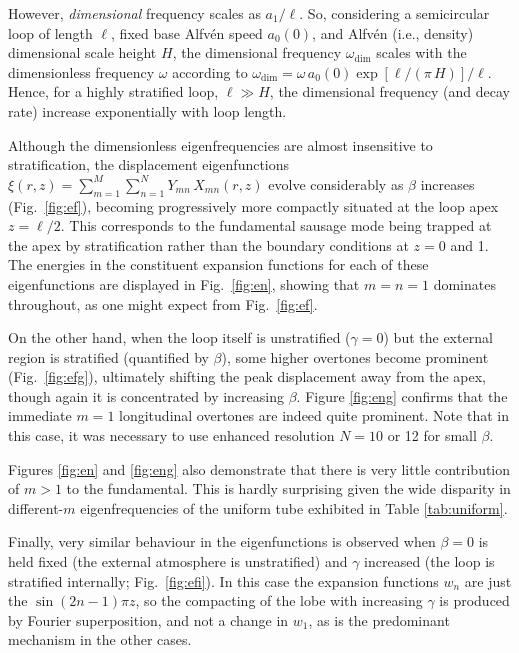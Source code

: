 \documentclass[12pt]{iopart}
\begin{document}
{However, \emph{dimensional} frequency scales as $a_1/\ell$. So, considering a semicircular loop of length $\ell$, fixed base Alfv\'en speed $a_0(0)$, and Alfv\'en (i.e., density) dimensional scale height $H$, the dimensional frequency $\omega_\text{dim}$ scales with the dimensionless frequency $\omega$ according to $\omega_\text{dim}=\omega\,a_0(0)\exp[\ell/(\pi\,H)]/\ell$. Hence, for a highly stratified loop, $\ell\gg H$, the dimensional frequency (and decay rate) increase exponentially with loop length.


Although the dimensionless eigenfrequencies are almost insensitive to stratification, the displacement eigenfunctions $\xi(r,z) = \sum_{m=1}^M \sum_{n=1}^N Y_{mn}\, X_{mn}(r,z)$ evolve considerably as $\beta$ increases (Fig.~\ref{fig:ef}), becoming progressively more compactly situated at the loop apex $z=\ell/2$. This corresponds to the fundamental sausage mode being trapped at the apex by stratification rather than the boundary conditions at $z=0$ and 1. The energies in the constituent expansion functions for each of these eigenfunctions are displayed in Fig.~\ref{fig:en}, showing that $m=n=1$ dominates throughout, as one might expect from Fig.~\ref{fig:ef}.



On the other hand, when the loop itself is unstratified ($\gamma=0$) but the external region is stratified (quantified by $\beta$), some higher overtones become prominent (Fig.~\ref{fig:efg}), ultimately shifting the peak displacement away from the apex, though again it is concentrated by increasing $\beta$. Figure \ref{fig:eng} confirms that the immediate $m=1$ longitudinal overtones are indeed quite prominent. Note that in this case, it was necessary to use enhanced resolution $N=10$ or 12 for small $\beta$.

Figures \ref{fig:en} and \ref{fig:eng} also demonstrate that there is very little contribution of $m>1$ to the fundamental. This is hardly surprising given the wide disparity in different-$m$ eigenfrequencies of the uniform tube exhibited in Table \ref{tab:uniform}.

Finally, very similar behaviour in the eigenfunctions is observed when $\beta=0$ is held fixed (the external atmosphere is unstratified) and $\gamma$ increased (the loop is stratified internally; Fig.~\ref{fig:efi}). In this case the expansion functions $w_n$ are just the $\sin (2n-1)\pi z$, so the compacting of the lobe with increasing $\gamma$ is produced by Fourier superposition, and not a change in $w_1$, as is the predominant mechanism in the other cases.

}
\end{document}
